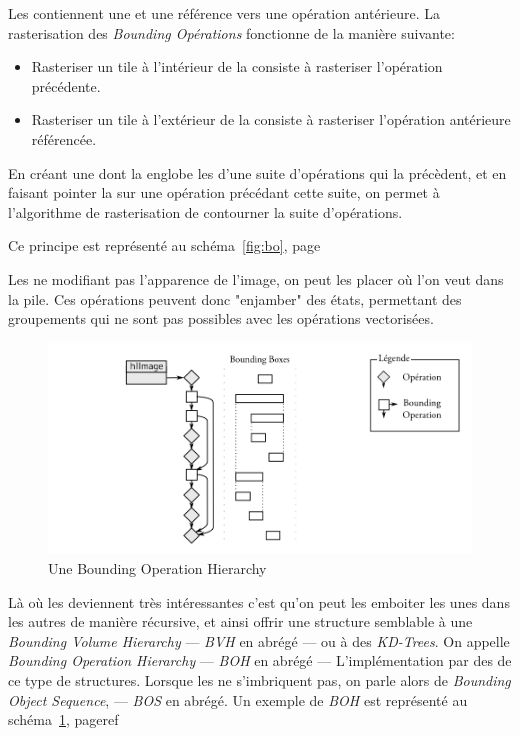 		Les \BO contiennent une \BB et une référence vers une opération antérieure.
		La rasterisation des \emph{Bounding Opérations} fonctionne de la manière suivante:
		\begin{itemize}
			\item Rasteriser un tile à l'intérieur de la \BB consiste à rasteriser l'opération précédente.
			\item Rasteriser un tile à l'extérieur de la \BB consiste à rasteriser l'opération antérieure référencée.
		\end{itemize}

		En créant une \BO dont la \BB englobe les \BB d'une suite
		d'opérations qui la précèdent, et en faisant pointer la \BO sur une opération précédant 
		cette suite, on permet à l'algorithme de rasterisation de contourner la suite d'opérations.
		
		Ce principe est représenté au schéma~\ref{fig:bo}, page~\pageref{fig:bo}

		Les \BO ne modifiant pas l'apparence de l'image, on peut les placer où l'on veut dans la pile. Ces 
		opérations peuvent donc "enjamber" des états, permettant des groupements qui ne sont pas possibles avec les opérations
		vectorisées.

		\begin{figure}[ht]
			\centering
			\includegraphics[width=\textwidth]{images/bo2} 
			\caption{Une Bounding Operation Hierarchy}
			\label{fig:bo2}
		\end{figure}

		Là où les \BO deviennent très intéressantes c'est qu'on peut les emboiter les unes dans les
		autres de manière récursive, et ainsi offrir une structure semblable à une \emph{Bounding Volume Hierarchy} 
		--- \emph{BVH} en abrégé --- ou à des \emph{KD-Trees}. On appelle \emph{Bounding Operation Hierarchy} --- \emph{BOH}
		en abrégé --- L'implémentation par des \BO de ce type de structures. Lorsque les \BO ne s'imbriquent pas, on parle alors de \emph{Bounding Object Sequence},
		--- \emph{BOS} en abrégé. Un exemple de \emph{BOH} est représenté au schéma~\ref{fig:bo2}, pageref~\pageref{fig:bo2} 

